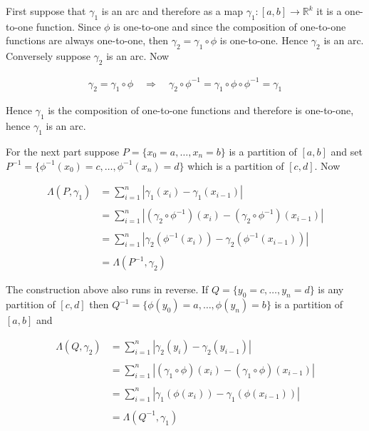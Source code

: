 \documentclass{article}
\begin{document}
  First suppose that $\gamma_1$ is an arc and therefore as a map $\gamma_1 : [a,b]\to \mathbb R^k$ it is a one-to-one function.  Since $\phi$ is one-to-one and since the composition of one-to-one functions are always one-to-one, then $\gamma_2 = \gamma_1\circ \phi$ is one-to-one.  Hence $\gamma_2$ is an arc.  Conversely suppose $\gamma_2$ is an arc.  Now 

  \begin{align*}
    \gamma_2 = \gamma_1\circ \phi \quad \Rightarrow \quad \gamma_2 \circ \phi^{-1} = \gamma_1\circ \phi\circ \phi^{-1} = \gamma_1
  \end{align*}

  Hence $\gamma_1$ is the composition of one-to-one functions and therefore is one-to-one, hence $\gamma_1$ is an arc.  

  \vspace{1cm}

  For the next part suppose $P=\{x_0=a,\dots,x_n=b\}$ is a partition of $[a,b]$ and set $P^{-1}=\{\phi^{-1}(x_0)=c,\dots,\phi^{-1}(x_n)=d\}$ which is a partition of $[c,d]$.  Now 
  
  \begin{align*}
    \Lambda(P,\gamma_1) &= \sum_{i=1}^n |\gamma_1(x_i)-\gamma_1(x_{i-1})| \\\\
    &= \sum_{i=1}^n |(\gamma_2\circ \phi^{-1})(x_i)-(\gamma_2\circ \phi^{-1})(x_{i-1})| \\\\
    &= \sum_{i=1}^n |\gamma_2(\phi^{-1}(x_i))-\gamma_2(\phi^{-1}(x_{i-1}))| \\\\
    &= \Lambda(P^{-1},\gamma_2)
  \end{align*}

  The construction above also runs in reverse.  If $Q=\{y_0=c,\dots,y_n=d\}$ is any partition of $[c,d]$ then $Q^{-1}=\{\phi(y_0)=a,\dots,\phi(y_n)=b\}$ is a partition of $[a,b]$ and 
  
  \begin{align*}
    \Lambda(Q,\gamma_2) &= \sum_{i=1}^n |\gamma_2(y_i)-\gamma_2(y_{i-1})| \\\\
    &= \sum_{i=1}^n |(\gamma_1\circ \phi)(x_i)-(\gamma_1\circ \phi)(x_{i-1})| \\\\
    &= \sum_{i=1}^n |\gamma_1(\phi(x_i))-\gamma_1(\phi(x_{i-1}))| \\\\
    &= \Lambda(Q^{-1},\gamma_1)
  \end{align*}
\end{document}
